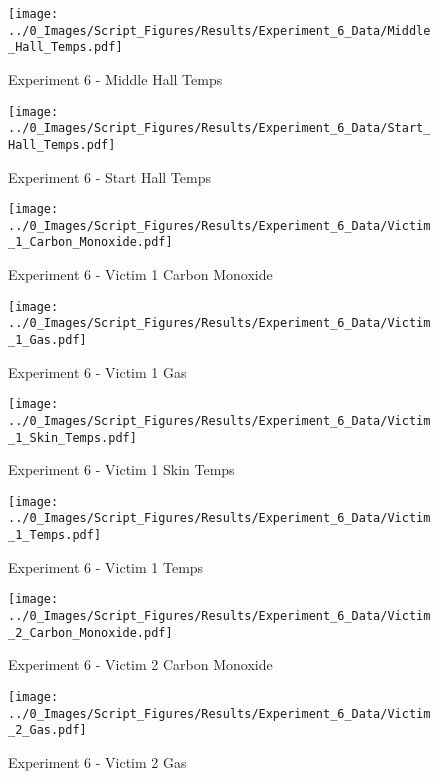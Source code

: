 	\begin{figure}[H]
		\centering
		\texttt{[image: ../0\_Images/Script\_Figures/Results/Experiment\_6\_Data/Middle\_Hall\_Temps.pdf]}
		\caption[]{Experiment 6 - Middle Hall Temps}
	\end{figure}
 
	\clearpage

	\begin{figure}[H]
		\centering
		\texttt{[image: ../0\_Images/Script\_Figures/Results/Experiment\_6\_Data/Start\_Hall\_Temps.pdf]}
		\caption[]{Experiment 6 - Start Hall Temps}
	\end{figure}
 

	\begin{figure}[H]
		\centering
		\texttt{[image: ../0\_Images/Script\_Figures/Results/Experiment\_6\_Data/Victim\_1\_Carbon\_Monoxide.pdf]}
		\caption[]{Experiment 6 - Victim 1 Carbon Monoxide}
	\end{figure}
 
	\clearpage

	\begin{figure}[H]
		\centering
		\texttt{[image: ../0\_Images/Script\_Figures/Results/Experiment\_6\_Data/Victim\_1\_Gas.pdf]}
		\caption[]{Experiment 6 - Victim 1 Gas}
	\end{figure}
 

	\begin{figure}[H]
		\centering
		\texttt{[image: ../0\_Images/Script\_Figures/Results/Experiment\_6\_Data/Victim\_1\_Skin\_Temps.pdf]}
		\caption[]{Experiment 6 - Victim 1 Skin Temps}
	\end{figure}
 
	\clearpage

	\begin{figure}[H]
		\centering
		\texttt{[image: ../0\_Images/Script\_Figures/Results/Experiment\_6\_Data/Victim\_1\_Temps.pdf]}
		\caption[]{Experiment 6 - Victim 1 Temps}
	\end{figure}
 

	\begin{figure}[H]
		\centering
		\texttt{[image: ../0\_Images/Script\_Figures/Results/Experiment\_6\_Data/Victim\_2\_Carbon\_Monoxide.pdf]}
		\caption[]{Experiment 6 - Victim 2 Carbon Monoxide}
	\end{figure}
 
	\clearpage

	\begin{figure}[H]
		\centering
		\texttt{[image: ../0\_Images/Script\_Figures/Results/Experiment\_6\_Data/Victim\_2\_Gas.pdf]}
		\caption[]{Experiment 6 - Victim 2 Gas}
	\end{figure}
 

